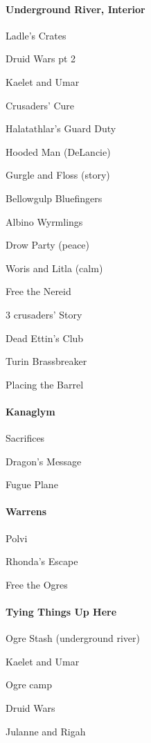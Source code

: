 \documentclass[10pt,a4,twoside]{book}
\begin{document}
\begin{multicols}{3}
\paragraph*{Underground River, Interior}
\begin{trivlist}
\item Ladle's Crates
\item Druid Wars pt 2
\item Kaelet and Umar
\item Crusaders' Cure %
\item Halatathlar's Guard Duty
\item Hooded Man (DeLancie)
\item Gurgle and Floss (story)
\item Bellowgulp Bluefingers
\item Albino Wyrmlings
\item Drow Party (peace) %
\item Woris and Litla (calm)
\item Free the Nereid
\item 3 crusaders' Story
\item Dead Ettin's Club
\item Turin Brassbreaker
\item Placing the Barrel
\end{trivlist}

\paragraph*{Kanaglym}
\begin{trivlist}
\item Sacrifices
\item Dragon's Message
\item Fugue Plane %
\end{trivlist}


\paragraph*{Warrens}
\begin{trivlist}
\item Polvi
\item Rhonda's Escape
\item Free the Ogres
\end{trivlist}

\paragraph*{Tying Things Up Here}
\begin{trivlist}
\item Ogre Stash (underground river)
\item Kaelet and Umar
\item Ogre camp 
\item Druid Wars
\item Julanne and Rigah %
\end{trivlist}


\end{multicols}
\end{document}
